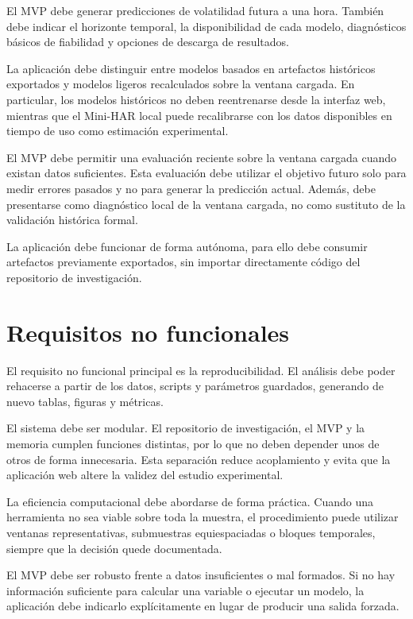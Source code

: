 El MVP debe generar predicciones de volatilidad futura a una hora. También debe indicar el horizonte temporal, la disponibilidad de cada modelo, diagnósticos básicos de fiabilidad y opciones de descarga de resultados.

La aplicación debe distinguir entre modelos basados en artefactos históricos exportados y modelos ligeros recalculados sobre la ventana cargada. En particular, los modelos históricos no deben reentrenarse desde la interfaz web, mientras que el Mini-HAR local puede recalibrarse con los datos disponibles en tiempo de uso como estimación experimental.

El MVP debe permitir una evaluación reciente sobre la ventana cargada cuando existan datos suficientes. Esta evaluación debe utilizar el objetivo futuro solo para medir errores pasados y no para generar la predicción actual. Además, debe presentarse como diagnóstico local de la ventana cargada, no como sustituto de la validación histórica formal.

La aplicación debe funcionar de forma autónoma, para ello debe consumir artefactos previamente exportados, sin importar directamente código del repositorio de investigación.

\section{Requisitos no funcionales}\label{sec:requisitos-no-funcionales}

El requisito no funcional principal es la reproducibilidad. El análisis debe poder rehacerse a partir de los datos, scripts y parámetros guardados, generando de nuevo tablas, figuras y métricas.

El sistema debe ser modular. El repositorio de investigación, el MVP y la memoria cumplen funciones distintas, por lo que no deben depender unos de otros de forma innecesaria. Esta separación reduce acoplamiento y evita que la aplicación web altere la validez del estudio experimental.

La eficiencia computacional debe abordarse de forma práctica. Cuando una herramienta no sea viable sobre toda la muestra, el procedimiento puede utilizar ventanas representativas, submuestras equiespaciadas o bloques temporales, siempre que la decisión quede documentada.

El MVP debe ser robusto frente a datos insuficientes o mal formados. Si no hay información suficiente para calcular una variable o ejecutar un modelo, la aplicación debe indicarlo explícitamente en lugar de producir una salida forzada.

